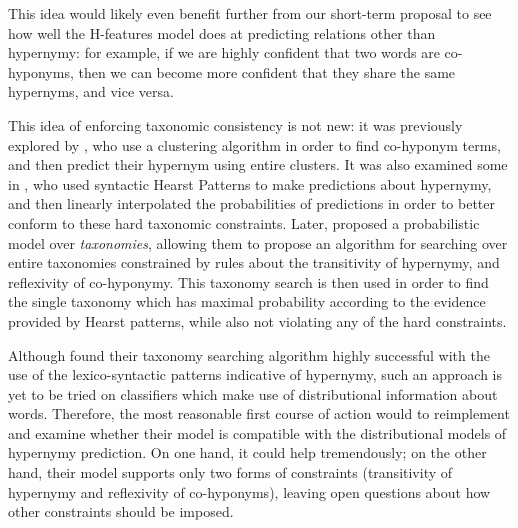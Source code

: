 \documentclass[12pt]{article}
\begin{document}
This idea would likely even benefit further from our short-term proposal to
see how well the H-features model does at predicting relations other
than hypernymy: for example, if we are highly confident that two words are
co-hyponyms, then we can become more confident that they share the same
hypernyms, and vice versa.

This idea of enforcing taxonomic consistency is not new: it was previously
explored by , who use a clustering algorithm in
order to find co-hyponym terms, and then predict their hypernym using entire
clusters. It was also examined some in , who used
syntactic Hearst Patterns to make predictions about hypernymy, and then
linearly interpolated the probabilities of predictions in order to better
conform to these hard taxonomic constraints. Later, 
proposed a probabilistic model over {\em taxonomies}, allowing them to propose
an algorithm for searching over entire taxonomies constrained by rules about
the transitivity of hypernymy, and reflexivity of co-hyponymy. This taxonomy
search is then used in order to find the single taxonomy which has maximal
probability according to the evidence provided by Hearst patterns, while also
not violating any of the hard constraints.

Although  found their taxonomy searching algorithm
highly successful with the use of the lexico-syntactic patterns indicative
of hypernymy, such an approach is yet to be tried on classifiers which make
use of distributional information about words. Therefore, the most reasonable
first course of action would to reimplement and examine whether their model
is compatible with the distributional models of hypernymy prediction. On one
hand, it could help tremendously; on the other hand, their model supports only
two forms of constraints (transitivity of hypernymy and reflexivity of
co-hyponyms), leaving open questions about how other constraints should be
imposed.
\end{document}
